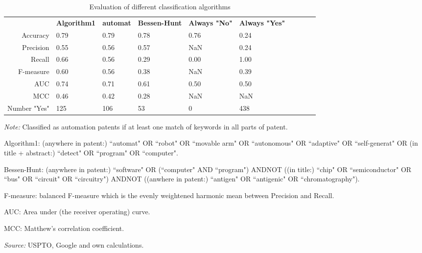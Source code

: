 \begin{table}
\begin{small}
\begin{threeparttable}
\caption{{\normalsize Evaluation of different classification algorithms}}
\label{table:table_compare_classalg}
\begin{tabular}{rlllllllll}
\toprule 
 & \textbf{Algorithm1} & \textbf{automat} & \textbf{Bessen-Hunt} & \textbf{Always "No"} & \textbf{Always "Yes"}  \tabularnewline 
Accuracy & 0.79 & 0.79 & 0.78 & 0.76 & 0.24 & & & &  \tabularnewline 
Precision & 0.55 & 0.56 & 0.57 & NaN & 0.24 & & & &  \tabularnewline 
Recall & 0.66 & 0.56 & 0.29 & 0.00 & 1.00 & & & &  \tabularnewline 
F-measure & 0.60 & 0.56 & 0.38 & NaN & 0.39 & & & &  \tabularnewline 
AUC & 0.74 & 0.71 & 0.61 & 0.50 & 0.50 & & & &  \tabularnewline 
MCC & 0.46 & 0.42 & 0.28 & NaN & NaN & & & &  \tabularnewline 
Number "Yes" & 125 & 106 & 53 & 0 & 438 & & & &  \tabularnewline 
\bottomrule 
\end{tabular} 
\begin{tablenotes}
\small
\item\textit{Note:} Classified as automation patents if at least one match of keywords in all parts of patent. \item Algorithm1: (anywhere in patent:) ``automat" OR ``robot" OR ``movable arm" OR ``autonomous" OR  ``adaptive" OR ``self-generat" OR (in title + abstract:) ``detect" OR ``program" OR ``computer".
\item Bessen-Hunt: (anywhere in patent:) ``software" OR (``computer" AND ``program") ANDNOT ((in title:) ``chip" OR ``semiconductor" OR ``bus" OR ``circuit" OR ``circuitry") ANDNOT ((anwhere in patent:) ``antigen" OR ``antigenic" OR ``chromatography").
\item F-measure: balanced F-measure which is the evenly weightened harmonic mean between Precision and Recall. 
\item AUC: Area under (the receiver operating) curve.
\item MCC: Matthew's correlation coefficient.
\item\textit{Source:} USPTO, Google and own calculations.
\end{tablenotes}
\end{threeparttable}
\end{small}
\end{table}
